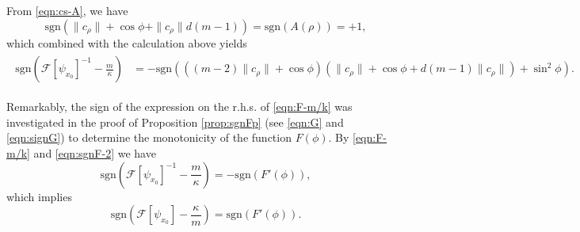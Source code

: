 \documentclass[11pt]{amsart}
\newcommand{\dm}{d} %
\begin{document}
From \eqref{eqn:cs-A}, we have
\[
\mathrm{sgn}\left(\|c_\rho\|+\cos\phi+\|c_\rho\|\dm(m-1)\right)=\mathrm{sgn}(A(\rho))=+1,
\]
which combined with the calculation above yields
\begin{align}
\begin{aligned}\label{eqn:F-m/k}
\mathrm{sgn}\left(\mathcal{F}[\psi_{x_0}]^{-1}-\frac{m}{\kappa}\right)
&=-\mathrm{sgn}\left(( (m-2)\|c_\rho\|+\cos\phi)(\|c_\rho\|+\cos\phi+\dm(m-1) \|c_\rho\|)+\sin^2\phi\right).
\end{aligned}
\end{align}

Remarkably, the sign of the expression on the r.h.s. of \ref{eqn:F-m/k} was investigated in the proof of Proposition \ref{prop:sgnFp} (see \eqref{eqn:G} and \eqref{eqn:signG}) to determine the monotonicity of the function $F(\phi)$. By \eqref{eqn:F-m/k} and \eqref{eqn:sgnF-2} we have
\begin{equation}
\label{eqn:sgnFpG}
\mathrm{sgn}\left(\mathcal{F}[\psi_{x_0}]^{-1}-\frac{m}{\kappa}\right)=-\mathrm{sgn}\left(F'(\phi)\right),
\end{equation}
which implies
\begin{equation}
\label{eqn:signdiff-sgnFp}
\mathrm{sgn}\left(\mathcal{F}[\psi_{x_0}]-\frac{\kappa}{m}\right)=\mathrm{sgn}\left(F'(\phi)\right).
\end{equation}
\end{document}
